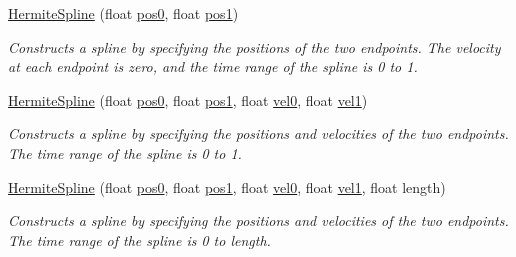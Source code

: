 \begin{DoxyCompactItemize}
\item 
\mbox{\hyperlink{struct_leap_1_1_unity_1_1_animation_1_1_hermite_spline_a22789bb3930bf61ef82cd091a06766d9}{Hermite\+Spline}} (float \mbox{\hyperlink{struct_leap_1_1_unity_1_1_animation_1_1_hermite_spline_a98993395f6b4ba8c68e7bcfe827bf308}{pos0}}, float \mbox{\hyperlink{struct_leap_1_1_unity_1_1_animation_1_1_hermite_spline_ac124f1bd8febef9b9472856c383e9698}{pos1}})
\begin{DoxyCompactList}\small\item\em Constructs a spline by specifying the positions of the two endpoints. The velocity at each endpoint is zero, and the time range of the spline is 0 to 1. \end{DoxyCompactList}\item 
\mbox{\hyperlink{struct_leap_1_1_unity_1_1_animation_1_1_hermite_spline_a7c8f0d19a152c70b3b58f892dddf7afe}{Hermite\+Spline}} (float \mbox{\hyperlink{struct_leap_1_1_unity_1_1_animation_1_1_hermite_spline_a98993395f6b4ba8c68e7bcfe827bf308}{pos0}}, float \mbox{\hyperlink{struct_leap_1_1_unity_1_1_animation_1_1_hermite_spline_ac124f1bd8febef9b9472856c383e9698}{pos1}}, float \mbox{\hyperlink{struct_leap_1_1_unity_1_1_animation_1_1_hermite_spline_ace4a3fb92bc4e44b6a844da6fb7c5a2b}{vel0}}, float \mbox{\hyperlink{struct_leap_1_1_unity_1_1_animation_1_1_hermite_spline_a99576b3c8cd67280f5ec30a1e2555c9b}{vel1}})
\begin{DoxyCompactList}\small\item\em Constructs a spline by specifying the positions and velocities of the two endpoints. The time range of the spline is 0 to 1. \end{DoxyCompactList}\item 
\mbox{\hyperlink{struct_leap_1_1_unity_1_1_animation_1_1_hermite_spline_a9750fb55dca761c774ae4773ff922a85}{Hermite\+Spline}} (float \mbox{\hyperlink{struct_leap_1_1_unity_1_1_animation_1_1_hermite_spline_a98993395f6b4ba8c68e7bcfe827bf308}{pos0}}, float \mbox{\hyperlink{struct_leap_1_1_unity_1_1_animation_1_1_hermite_spline_ac124f1bd8febef9b9472856c383e9698}{pos1}}, float \mbox{\hyperlink{struct_leap_1_1_unity_1_1_animation_1_1_hermite_spline_ace4a3fb92bc4e44b6a844da6fb7c5a2b}{vel0}}, float \mbox{\hyperlink{struct_leap_1_1_unity_1_1_animation_1_1_hermite_spline_a99576b3c8cd67280f5ec30a1e2555c9b}{vel1}}, float length)
\begin{DoxyCompactList}\small\item\em Constructs a spline by specifying the positions and velocities of the two endpoints. The time range of the spline is 0 to length. \end{DoxyCompactList}\item 

\end{DoxyCompactItemize}
